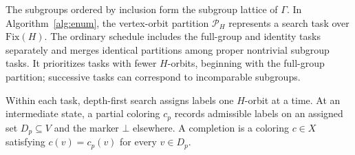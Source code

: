 The subgroups ordered by inclusion form the subgroup lattice of $\Gamma$. In Algorithm~\ref{alg:enum}, the vertex-orbit partition $\mathcal{P}_H$ represents a search task over $\mathrm{Fix}(H)$. The ordinary schedule includes the full-group and identity tasks separately and merges identical partitions among proper nontrivial subgroup tasks. It prioritizes tasks with fewer $H$-orbits, beginning with the full-group partition; successive tasks can correspond to incomparable subgroups.

Within each task, depth-first search assigns labels one $H$-orbit at a time. At an intermediate state, a partial coloring $c_p$ records admissible labels on an assigned set $D_p\subseteq V$ and the marker $\bot$ elsewhere. A completion is a coloring $c\in X$ satisfying $c(v)=c_p(v)$ for every $v\in D_p$.

